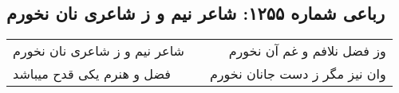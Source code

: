 \begin{center}
\section*{رباعی شماره ۱۲۵۵: شاعر نیم و ز شاعری نان نخورم}
\label{sec:1255}
\begin{longtable}{l p{0.5cm} r}
شاعر نیم و ز شاعری نان نخورم
&&
وز فضل نلافم و غم آن نخورم
\\
فضل و هنرم یکی قدح میباشد
&&
وان نیز مگر ز دست جانان نخورم
\\
\end{longtable}
\end{center}
